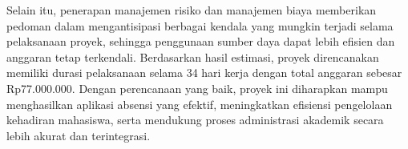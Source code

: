 \documentclass[12pt,a4paper]{article}
\begin{document}
Selain itu, penerapan manajemen risiko dan manajemen biaya memberikan pedoman dalam mengantisipasi berbagai kendala yang mungkin terjadi selama pelaksanaan proyek, sehingga penggunaan sumber daya dapat lebih efisien dan anggaran tetap terkendali. Berdasarkan hasil estimasi, proyek direncanakan memiliki durasi pelaksanaan selama 34 hari kerja dengan total anggaran sebesar Rp77.000.000. Dengan perencanaan yang baik, proyek ini diharapkan mampu menghasilkan aplikasi absensi yang efektif, meningkatkan efisiensi pengelolaan kehadiran mahasiswa, serta mendukung proses administrasi akademik secara lebih akurat dan terintegrasi.
\end{document}
